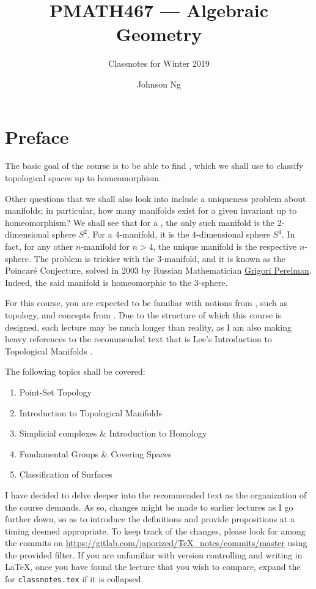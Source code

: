 \documentclass[notoc,notitlepage]{tufte-book}
\title{PMATH467 --- Algebraic Geometry}
\author{Johnson Ng}
\subtitle{Classnotes for Winter 2019}
\begin{document}


\chapter*{Preface}%
\label{chp:preface}

The basic goal of the course is to be able to find , which we shall use to classify topological spaces up to homeomorphism.

Other questions that we shall also look into include a uniqueness problem about manifolds; in particular, how many manifolds exist for a given invariant up to homeomorphism? We shall see that for a , the only such manifold is the 2-dimensional sphere $S^2$. For a $4$-manifold, it is the $4$-dimensional sphere $S^4$. In fact, for any other $n$-manifold for $n > 4$, the unique manifold is the respective $n$-sphere. The problem is trickier with the $3$-manifold, and it is known as the Poincar\'{e} Conjecture, solved in 2003 by Russian Mathematician \href{https://en.wikipedia.org/wiki/Grigori_Perelman}{Grigori Perelman}. Indeed, the said manifold is homeomorphic to the $3$-sphere.

For this course, you are expected to be familiar with notions from ,
such as topology, and concepts from . Due to the structure of which this
course is designed, each lecture may be much longer than reality, as I am also making heavy
references to the recommended text that is Lee's Introduction to Topological Manifolds
\cite{johnlee2000}.

The following topics shall be covered:
\begin{enumerate}
  \item Point-Set Topology
  \item Introduction to Topological Manifolds
  \item Simplicial complexes \& Introduction to Homology
  \item Fundamental Groups \& Covering Spaces
  \item Classification of Surfaces
\end{enumerate}

\textbf{} I have decided to delve deeper into the recommended text
as the organization of the course demands. As so, changes might be made to earlier
lectures as I go further down, so as to introduce the definitions and provide propositions
at a timing deemed appropriate. To keep track of the changes, please look for
 among the commits on
\url{https://gitlab.com/japorized/TeX_notes/commits/master} using the provided filter. If
you are unfamiliar with version controlling and writing in \LaTeX, once you have found the
lecture that you wish to compare, expand the  for \texttt{classnotes.tex}
if it is collapsed.
\end{document}

